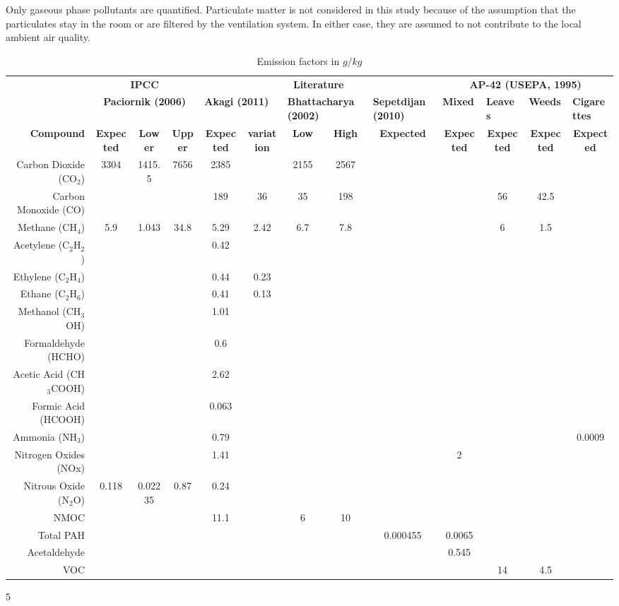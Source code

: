 Only gaseous phase pollutants are quantified. Particulate matter is not considered in this study because of the assumption that the particulates stay in the room or are filtered by the ventilation system. In either case, they are assumed to not contribute to the local ambient air quality.
%
\begin{table}[]
\centering
\caption{ Emission factors in $g/kg$}
\label{tb1:initialfactors}
\begin{tabular}{@{}rcccccccccccc@{}}
\toprule
 & \multicolumn{3}{c}{\textbf{IPCC}} & \multicolumn{5}{c}{\textbf{Literature}} & \multicolumn{4}{c}{\textbf{AP-42  (USEPA, 1995)}} \\ 
 & \multicolumn{3}{c}{\textbf{Paciornik (2006)}} & \multicolumn{2}{l}{\textbf{Akagi (2011)}} & \multicolumn{2}{l}{\textbf{Bhattacharya (2002)}} & \multicolumn{1}{l}{\textbf{Sepetdijan (2010)}} & \multicolumn{1}{l}{\textbf{Mixed}} & \multicolumn{1}{l}{\textbf{Leaves}} & \multicolumn{1}{l}{\textbf{Weeds}} & \multicolumn{1}{l}{\textbf{Cigarettes}} \\
\textbf{Compound} & \textbf{Expected} & \textbf{Lower} & \textbf{Upper} & \textbf{Expected} & \textbf{variation} & \textbf{Low} & \textbf{High} & \textbf{Expected} & \textbf{Expected} & \textbf{Expected} & \textbf{Expected} & \textbf{Expected} \\ \midrule
Carbon Dioxide (CO$_{2}$) & 3304 & 1415.5 & 7656 & 2385 &  & 2155 & 2567 &  &  &  &  &  \\
Carbon Monoxide (CO) &  &  &  & 189 & 36 & 35 & 198 &  &  & 56 & 42.5 &  \\
Methane (CH$_{4}$) & 5.9 & 1.043 & 34.8 & 5.29 & 2.42 & 6.7 & 7.8 &  &  & 6 & 1.5 &  \\
Acetylene (C$_{2}$H$_{2}$) &  &  &  & 0.42 &  &  &  &  &  &  &  &  \\
Ethylene (C$_{2}$H$_{4}$) &  &  &  & 0.44 & 0.23 &  &  &  &  &  &  &  \\
Ethane (C$_{2}$H$_{6}$) &  &  &  & 0.41 & 0.13 &  &  &  &  &  &  &  \\
Methanol (CH$_{3}$OH) &  &  &  & 1.01 &  &  &  &  &  &  &  &  \\
Formaldehyde (HCHO) &  &  &  & 0.6 &  &  &  &  &  &  &  &  \\
Acetic Acid (CH$_{3}$COOH) &  &  &  & 2.62 &  &  &  &  &  &  &  &  \\
Formic Acid (HCOOH) &  &  &  & 0.063 &  &  &  &  &  &  &  &  \\
Ammonia (NH$_{3}$) &  &  &  & 0.79 &  &  &  &  &  &  &  & 0.0009 \\
Nitrogen Oxides (NOx) &  &  &  & 1.41 &  &  &  &  & 2 &  &  &  \\
Nitrous Oxide (N$_{2}$O) & 0.118 & 0.02235 & 0.87 & 0.24 &  &  &  &  &  &  &  &  \\
NMOC &  &  &  & 11.1 &  & 6 & 10 &  &  &  &  &  \\
Total PAH &  &  &  &  &  &  &  & 0.000455 & 0.0065 &  &  &  \\
Acetaldehyde &  &  &  &  &  &  &  &  & 0.545 &  &  &  \\
VOC &  &  &  &  &  &  &  &  &  & 14 & 4.5 &  \\ \bottomrule
\end{tabular}
\end{table}5	 

